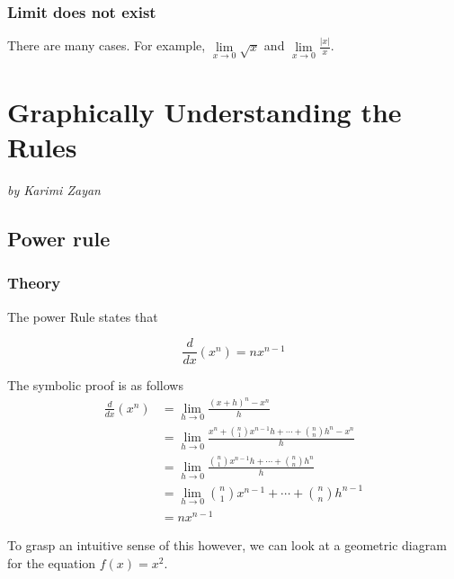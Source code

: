 \documentclass[a4paper,12pt,oneside]{book}
\begin{document}
\subsection{Limit does not exist}
There are many cases. For example,
$\lim\limits_{x \to 0} \sqrt{x}$ and
$\lim\limits_{x \to 0} \frac{|x|}{x}$.




\newpage
\chapter{Graphically Understanding the Rules}
\vspace{-30pt}
\large \textit{by Karimi Zayan}

\section{Power rule}

\subsection{Theory}

The power Rule states that

$$\frac{d}{dx}(x^n)=nx^{n-1}$$

 \noindent The symbolic proof is as follows
$$
\begin{aligned}
\frac{d}{dx}(x^n)&=\lim_{h\to 0}\frac{(x+h)^n-x^n}{h}\\
&=\lim_{h\to 0}\frac{x^n+\binom{n}{1}x^{n-1}h+\cdots +\binom{n}{n}h^n-x^n}{h}\\
&=\lim_{h\to 0}\frac{\binom{n}{1}x^{n-1}h+\cdots +\binom{n}{n}h^n}{h}\\
&=\lim_{h\to 0}\binom{n}{1}x^{n-1}+\cdots +\binom{n}{n}h^{n-1}\\
&=nx^{n-1}
\end{aligned}
$$

 \noindent To grasp an intuitive sense of this however, we can look at a geometric diagram for the equation $f(x)=x^2$.
\end{document}
